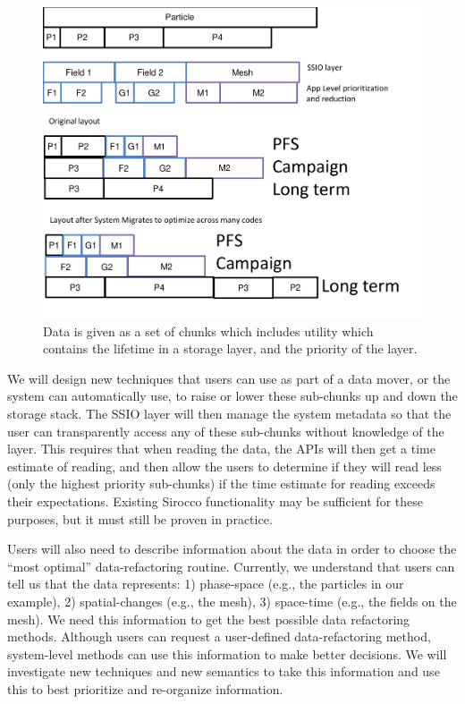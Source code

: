 \begin{figure}
        \begin{centering} 
	\includegraphics[scale=0.77]{graphics/SSIO-bucket.pdf}
        \caption{Data is given as a set of chunks which includes utility which contains the lifetime in a storage layer, and the priority of the layer.}
        \label{fig:ssio-bucket}
        \end{centering}
\end{figure}


We will design new techniques that users can use as part of a data mover, or
the system can automatically use, to raise or lower these sub-chunks up and
down the storage stack. The SSIO layer will then manage the system metadata so
that the user can transparently access any of these sub-chunks without
knowledge of the layer. This requires that when reading the data, the APIs will
then get a time estimate of reading, and then allow the users to determine if
they will read less (only the highest priority sub-chunks) if the time estimate
for reading exceeds their expectations. Existing Sirocco functionality may be
sufficient for these purposes, but it must still be proven in practice.
%

Users will also need to describe information about the data in order to choose
the ``most optimal'' data-refactoring routine. Currently, we understand that
users can tell us that the data represents: 1) phase-space (e.g., the particles
in our example), 2) spatial-changes (e.g., the mesh), 3) space-time (e.g.,
the fields on the mesh). We need this information to get the best possible data
refactoring methods. Although users can request a user-defined data-refactoring
method, system-level methods can use this information to make better decisions.
We will investigate new techniques and new semantics to take this information
and use this to best prioritize and re-organize information.

